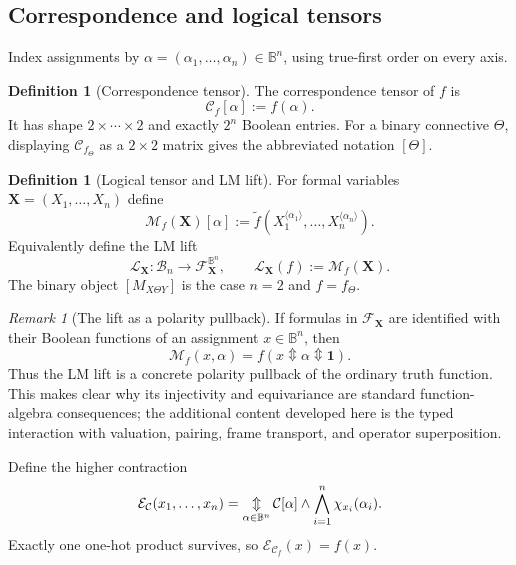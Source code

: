\documentclass[11pt]{article}
\theoremstyle{definition}
\newtheorem{definition}[theorem]{Definition}
\theoremstyle{remark}
\newtheorem{remark}[theorem]{Remark}
\newcommand{\B}{\mathbb B}
\newcommand{\cF}{\mathcal F}
\newcommand{\cC}{\mathcal C}
\newcommand{\cM}{\mathcal M}
\newcommand{\xor}{\mathbin{\Updownarrow}}
\newcommand{\bigxor}{\mathop{\Updownarrow}\displaylimits}
\begin{document}
\subsection{Correspondence and logical tensors}

Index assignments by $\alpha=(\alpha_1,\ldots,\alpha_n)\in\B^n$, using true-first order on every axis.
\begin{definition}[Correspondence tensor]
The correspondence tensor of $f$ is
\begin{equation}
 \cC_f[\alpha]:=f(\alpha).
 \label{eq:ctensor}
\end{equation}
It has shape $2\times\cdots\times2$ and exactly $2^n$ Boolean entries.  For a binary connective $\Theta$, displaying $\cC_{f_\Theta}$ as a $2\times2$ matrix gives the abbreviated notation $[\Theta]$.
\end{definition}

\begin{definition}[Logical tensor and LM lift]
For formal variables $\mathbf X=(X_1,\ldots,X_n)$ define
\begin{equation}
 \cM_f(\mathbf X)[\alpha]
 :=\widetilde f\!\left(X_1^{\langle\alpha_1\rangle},\ldots,
 X_n^{\langle\alpha_n\rangle}\right).
 \label{eq:ltensor}
\end{equation}
Equivalently define the LM lift
\begin{equation}
 \mathcal L_{\mathbf X}:\mathcal B_n\longrightarrow\cF_{\mathbf X}^{\B^n},\qquad
 \mathcal L_{\mathbf X}(f):=\cM_f(\mathbf X).
 \label{eq:lmlift}
\end{equation}
The binary object $[M_{X\Theta Y}]$ is the case $n=2$ and $f=f_\Theta$.
\end{definition}

\begin{remark}[The lift as a polarity pullback]
If formulas in $\cF_{\mathbf X}$ are identified with their Boolean functions of an assignment $x\in\B^n$, then
\begin{equation}
 \cM_f(x,\alpha)=f(x\xor\alpha\xor\mathbf1).
 \label{eq:pullbackform}
\end{equation}
Thus the LM lift is a concrete polarity pullback of the ordinary truth function.  This makes clear why its injectivity and equivariance are standard function-algebra consequences; the additional content developed here is the typed interaction with valuation, pairing, frame transport, and operator superposition.
\end{remark}

Define the higher contraction
\begin{equation}
 \mathcal E_{\cC}(x_1,\ldots,x_n)
 =\bigxor_{\alpha\in\B^n}
 \cC[\alpha]\land\bigwedge_{i=1}^n\chi_{x_i}(\alpha_i).
 \label{eq:multiselect}
\end{equation}
Exactly one one-hot product survives, so $\mathcal E_{\cC_f}(x)=f(x)$.
\end{document}
